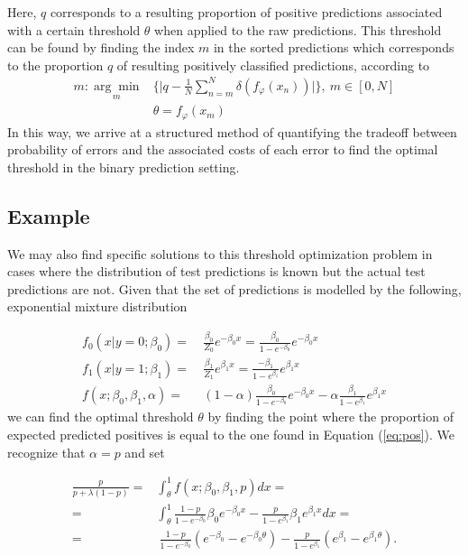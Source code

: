 \documentclass{article}
\begin{document}
Here, $q$ corresponds to a resulting proportion of positive predictions associated with a certain threshold $\theta$ when applied to the raw predictions. This threshold can be found by finding the index $m$ in the sorted predictions which corresponds to the proportion $q$ of resulting positively classified predictions, according to
\begin{align*}
m : \underset{m}{\arg \min}&\Big\{ \Big \lvert q - \frac{1}{N}\sum_{n=m}^N\delta(f_\varphi(x_n)) \Big \rvert \Big\}, \ m \in [0, N] \\
&\theta = f_\varphi(x_m)
\end{align*}
In this way, we arrive at a structured method of quantifying the tradeoff between probability of errors and the associated costs of each error to find the optimal threshold in the binary prediction setting.


\subsection{Example}

We may also find specific solutions to this threshold optimization problem in cases where the distribution of test predictions is known but the actual test predictions are not.
Given that the set of predictions is modelled by the following, exponential mixture distribution

\begin{align*}
    f_0(x\vert y=0;\beta_0) =& \ \frac{\beta_0}{Z_0}e^{-\beta_0 x} = \frac{\beta_0}{1-e^{-\beta_0}}e^{-\beta_0 x} \\
    f_1(x\vert y=1;\beta_1) =& \ \frac{\beta_1}{Z_1}e^{\beta_1 x} = \frac{-\beta_1}{1-e^{\beta_1}}e^{\beta_1 x}\\
    f (x;\beta_0,\beta_1,\alpha) =& \ (1-\alpha)\frac{\beta_0}{1-e^{-\beta_0}}e^{-\beta_0 x} - \alpha\frac{\beta_1}{1-e^{\beta_1}}e^{\beta_1 x} %
\end{align*}
we can find the optimal threshold $\theta$ by finding the point where the proportion of expected predicted positives is equal to the one found in Equation (\ref{eq:pos}). We recognize that $\alpha = p$ and set

\begin{align}
    \frac{p}{p+\lambda(1-p)} = & \int_{\theta}^1 f(x;\beta_0, \beta_1, p) dx = \\
    = & \int_{\theta}^1 \frac{1-p}{1-e^{-\beta_0}}\beta_0e^{-\beta_0x} - \frac{p}{1-e^{\beta_1}}\beta_1e^{\beta_1x} dx = \\
    = & \ \frac{1-p}{1-e^{-\beta_0}}(e^{-\beta_0}-e^{-\beta_0 \theta}) - \frac{p}{1-e^{\beta_1}}(e^{\beta_1}-e^{\beta_1 \theta})\text{.}
\end{align}
\end{document}
